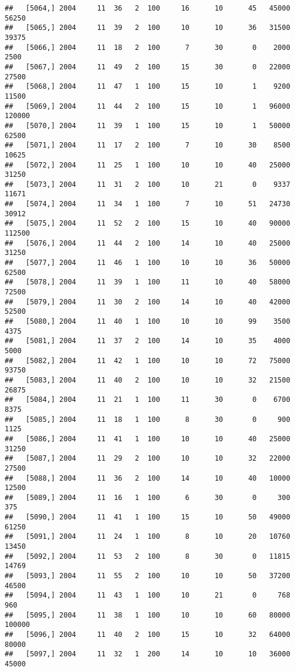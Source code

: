 \documentclass{article}\usepackage[]{graphicx}\usepackage[]{color}
\makeatletter
\newenvironment{kframe}{%
 \def\at@end@of@kframe{}%
 \ifinner\ifhmode%
  \def\at@end@of@kframe{\end{minipage}}%
  \begin{minipage}{\columnwidth}%
 \fi\fi%
 \def\FrameCommand##1{\hskip\@totalleftmargin \hskip-\fboxsep
 \colorbox{shadecolor}{##1}\hskip-\fboxsep
     \hskip-\linewidth \hskip-\@totalleftmargin \hskip\columnwidth}%
 \MakeFramed {\advance\hsize-\width
   \@totalleftmargin\z@ \linewidth\hsize
   \@setminipage}}%
 {\par\unskip\endMakeFramed%
 \at@end@of@kframe}
\newenvironment{knitrout}{}{} %
\makeatother
\begin{document}
\begin{knitrout}
\begin{kframe}
\begin{verbatim}
##   [5064,] 2004     11  36   2  100     16      10      45   45000   56250
##   [5065,] 2004     11  39   2  100     10      10      36   31500   39375
##   [5066,] 2004     11  18   2  100      7      30       0    2000    2500
##   [5067,] 2004     11  49   2  100     15      30       0   22000   27500
##   [5068,] 2004     11  47   1  100     15      10       1    9200   11500
##   [5069,] 2004     11  44   2  100     15      10       1   96000  120000
##   [5070,] 2004     11  39   1  100     15      10       1   50000   62500
##   [5071,] 2004     11  17   2  100      7      10      30    8500   10625
##   [5072,] 2004     11  25   1  100     10      10      40   25000   31250
##   [5073,] 2004     11  31   2  100     10      21       0    9337   11671
##   [5074,] 2004     11  34   1  100      7      10      51   24730   30912
##   [5075,] 2004     11  52   2  100     15      10      40   90000  112500
##   [5076,] 2004     11  44   2  100     14      10      40   25000   31250
##   [5077,] 2004     11  46   1  100     10      10      36   50000   62500
##   [5078,] 2004     11  39   1  100     11      10      40   58000   72500
##   [5079,] 2004     11  30   2  100     14      10      40   42000   52500
##   [5080,] 2004     11  40   1  100     10      10      99    3500    4375
##   [5081,] 2004     11  37   2  100     14      10      35    4000    5000
##   [5082,] 2004     11  42   1  100     10      10      72   75000   93750
##   [5083,] 2004     11  40   2  100     10      10      32   21500   26875
##   [5084,] 2004     11  21   1  100     11      30       0    6700    8375
##   [5085,] 2004     11  18   1  100      8      30       0     900    1125
##   [5086,] 2004     11  41   1  100     10      10      40   25000   31250
##   [5087,] 2004     11  29   2  100     10      10      32   22000   27500
##   [5088,] 2004     11  36   2  100     14      10      40   10000   12500
##   [5089,] 2004     11  16   1  100      6      30       0     300     375
##   [5090,] 2004     11  41   1  100     15      10      50   49000   61250
##   [5091,] 2004     11  24   1  100      8      10      20   10760   13450
##   [5092,] 2004     11  53   2  100      8      30       0   11815   14769
##   [5093,] 2004     11  55   2  100     10      10      50   37200   46500
##   [5094,] 2004     11  43   1  100     10      21       0     768     960
##   [5095,] 2004     11  38   1  100     10      10      60   80000  100000
##   [5096,] 2004     11  40   2  100     15      10      32   64000   80000
##   [5097,] 2004     11  32   1  200     14      10      10   36000   45000

\end{verbatim}
\end{kframe}
\end{knitrout}
\end{document}
